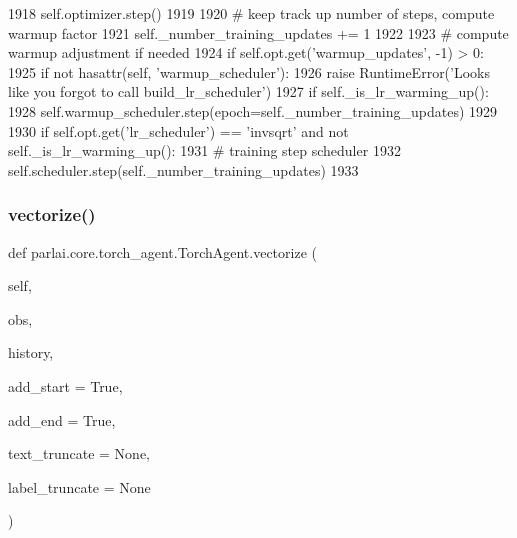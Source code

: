 \begin{DoxyCode}
1918         self.optimizer.step()
1919 
1920         \textcolor{comment}{# keep track up number of steps, compute warmup factor}
1921         self.\_number\_training\_updates += 1
1922 
1923         \textcolor{comment}{# compute warmup adjustment if needed}
1924         \textcolor{keywordflow}{if} self.opt.get(\textcolor{stringliteral}{'warmup\_updates'}, -1) > 0:
1925             \textcolor{keywordflow}{if} \textcolor{keywordflow}{not} hasattr(self, \textcolor{stringliteral}{'warmup\_scheduler'}):
1926                 \textcolor{keywordflow}{raise} RuntimeError(\textcolor{stringliteral}{'Looks like you forgot to call build\_lr\_scheduler'})
1927             \textcolor{keywordflow}{if} self.\_is\_lr\_warming\_up():
1928                 self.warmup\_scheduler.step(epoch=self.\_number\_training\_updates)
1929 
1930         \textcolor{keywordflow}{if} self.opt.get(\textcolor{stringliteral}{'lr\_scheduler'}) == \textcolor{stringliteral}{'invsqrt'} \textcolor{keywordflow}{and} \textcolor{keywordflow}{not} self.\_is\_lr\_warming\_up():
1931             \textcolor{comment}{# training step scheduler}
1932             self.scheduler.step(self.\_number\_training\_updates)
1933 
\end{DoxyCode}
\mbox{\label{classparlai_1_1core_1_1torch__agent_1_1TorchAgent_a48bb9b153353a0565ab7253dc1daef99}} 
\subsubsection{\texorpdfstring{vectorize()}{vectorize()}}
{\footnotesize\ttfamily def parlai.\+core.\+torch\+\_\+agent.\+Torch\+Agent.\+vectorize (\begin{DoxyParamCaption}\item[{}]{self,  }\item[{}]{obs,  }\item[{}]{history,  }\item[{}]{add\+\_\+start = {\ttfamily True},  }\item[{}]{add\+\_\+end = {\ttfamily True},  }\item[{}]{text\+\_\+truncate = {\ttfamily None},  }\item[{}]{label\+\_\+truncate = {\ttfamily None} }\end{DoxyParamCaption})}

